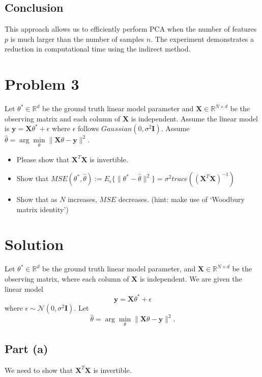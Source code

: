 \documentclass[11pt]{article}
\newcommand{\R}{\mathbb{R}}
\newcommand{\mtx}[1]{\mathbf{#1}}
\newcommand{\vct}[1]{\mathbf{#1}}
\def \mI {\mtx{I}}
\def \mX {\mtx{X}}
\def \vy {\vct{y}}
\def \R {\mathbb{R}}
\begin{document}
	\subsection*{Conclusion}
	This approach allows us to efficiently perform PCA when the number of features $p$ is much larger than the number of samples $n$. The experiment demonstrates a reduction in computational time using the indirect method.	
	
	\newpage

	
	\section*{Problem 3}
	Let $\theta^*\in\R^d$ be the ground truth linear model parameter and $\mX\in\R^{N\times d}$ be the observing matrix and each column of $\mX$ is independent. Assume the linear model is $\vy=\mX\theta^*+\epsilon$ where $\epsilon$ follows $Gaussian(0,\sigma^2\mI)$. Assume $\hat{\theta}=\arg\min\limits_\theta \|\mX\theta-\vy\|^2$.
	\begin{itemize}
		\item Please show that $\mX^T\mX$ is invertible.
		\item Show that $MSE(\theta^*,\hat{\theta}):=E_\epsilon \{\|\theta^*-\hat{\theta}\|^2\}=\sigma^2 trace((\mX^T\mX)^{-1})$
		\item Show that as $N$ increases, $MSE$ decreases. (hint: make use of `Woodbury matrix identity')
	\end{itemize} 

	\section*{Solution}

	Let $\theta^* \in \mathbb{R}^d$ be the ground truth linear model parameter, and $\mathbf{X} \in \mathbb{R}^{N \times d}$ be the observing matrix, where each column of $\mathbf{X}$ is independent. We are given the linear model 
	\[
	\mathbf{y} = \mathbf{X} \theta^* + \epsilon
	\] 
	where $\epsilon \sim \mathcal{N}(0, \sigma^2 \mathbf{I})$. Let 
	\[
	\hat{\theta} = \arg\min_{\theta} \|\mathbf{X} \theta - \mathbf{y}\|^2.
	\]
	
	\subsection*{Part (a)}
	We need to show that $\mathbf{X}^T \mathbf{X}$ is invertible.
	
\end{document}
